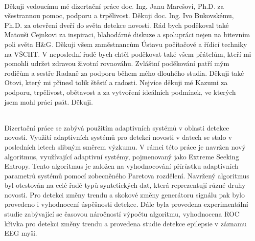  \vspace*{\fill}
  \\ [5mm]
Děkuji vedoucímu mé dizertační práce doc. Ing. Janu Marešovi, Ph.D. za všestrannou pomoc, podporu a trpělivost. Děkuji doc. Ing. Ivo Bukovskému, Ph.D.  za otevření dveří do světa detekce novosti. Rád bych poděkoval také Matouši Cejnkovi za inspiraci, blahodárné diskuze a spolupráci nejen na bitevním poli světa H\&G. Děkuji všem zaměstnancům Ústavu počítačové a řídicí techniky na VŠCHT. V neposlední řadě bych chtěl poděkovat také všem přátelům, kteří mi pomohli udržet zdravou životní rovnováhu. Zvláštní poděkování patří  mým rodičům a sestře Radaně za podporu během mého dlouhého studia. Děkuji také Otovi, který mi přinesl tolik štěstí a radosti. Nejvíce děkuji mé Kazumi za podporu, trpělivost, obětavost a za vytvoření ideálních podmínek, ve kterých jsem mohl práci psát. Děkuji.

 





\cleardoublepage
\thispagestyle{empty}

 \\ [5mm]
Dizertační práce se zabývá použitím adaptivních systémů v oblasti detekce novosti. Využití adaptivních systémů pro detekci novosti v datech se stalo v posledních letech slibným směrem výzkumu. V rámci této práce je navržen nový algoritmus, využívající adaptivní systémy, pojmenovaný jako Extreme Seeking Entropy. Tento algoritmus je založen na vyhodnocování přírůstku adaptivních parametrů systémů pomocí zobecněného Paretova rozdělení. Navržený algoritmus byl otestován na celé řadě typů syntetických dat, která reprezentují různé druhy novosti. Pro detekci změny trendu a skokové změny generátoru signálu pak bylo provedeno i vyhodnocení úspěšnosti detekce. Dále byla provedena experimentální studie zabývající se časovou náročností výpočtu algoritmu, vyhodnocena ROC křivka pro detekci změny trendu a provedena studie detekce epilepsie v záznamu EEG myši.\\ [5mm]
  \\ [5mm] 


\cleardoublepage
\thispagestyle{empty}


